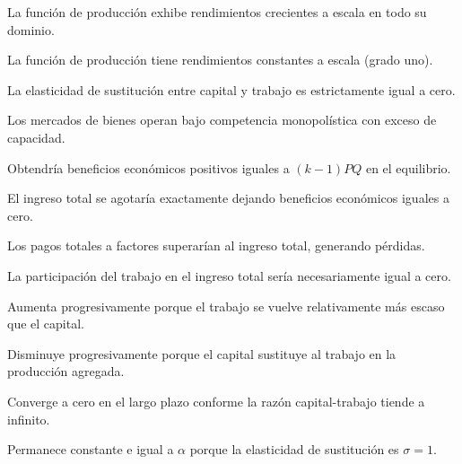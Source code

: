 \begin{opts}
    \item La función de producción exhibe rendimientos crecientes a escala en todo su dominio.
    \item La función de producción tiene rendimientos constantes a escala (grado uno).
    \item La elasticidad de sustitución entre capital y trabajo es estrictamente igual a cero.
    \item Los mercados de bienes operan bajo competencia monopolística con exceso de capacidad.
\end{opts}

\begin{opts}
    \item Obtendría beneficios económicos positivos iguales a $(k - 1)PQ$ en el equilibrio.
    \item El ingreso total se agotaría exactamente dejando beneficios económicos iguales a cero.
    \item Los pagos totales a factores superarían al ingreso total, generando pérdidas.
    \item La participación del trabajo en el ingreso total sería necesariamente igual a cero.
\end{opts}

\begin{opts}
    \item Aumenta progresivamente porque el trabajo se vuelve relativamente más escaso que el capital.
    \item Disminuye progresivamente porque el capital sustituye al trabajo en la producción agregada.
    \item Converge a cero en el largo plazo conforme la razón capital-trabajo tiende a infinito.
    \item Permanece constante e igual a $\alpha$ porque la elasticidad de sustitución es $\sigma = 1$.
\end{opts}

